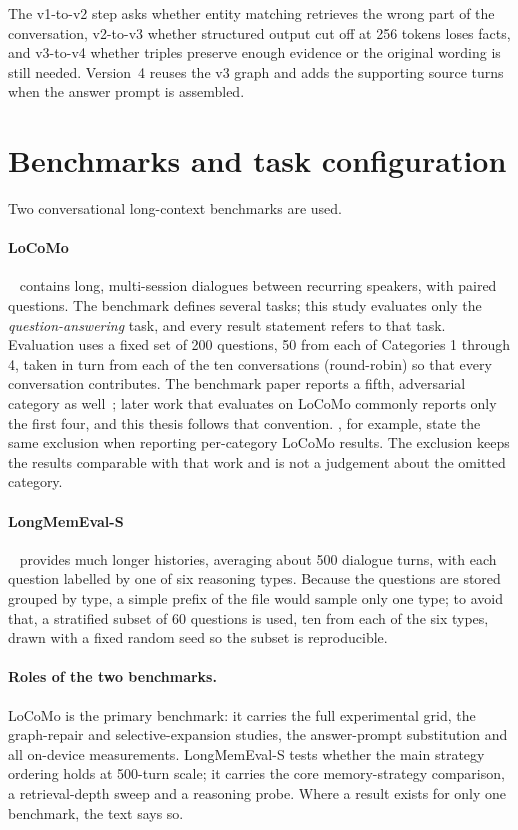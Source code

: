 The v1-to-v2 step asks whether entity matching retrieves the wrong part of the conversation, v2-to-v3
whether structured output cut off at 256 tokens loses facts, and v3-to-v4 whether triples preserve
enough evidence or the original wording is still needed. Version~4 reuses the v3 graph and adds the
supporting source turns when the answer prompt is assembled.

\section{Benchmarks and task configuration}
\label{sec:benchmarks}

Two conversational long-context benchmarks are used.

\paragraph{LoCoMo}~\citep{locomo} contains long, multi-session dialogues between recurring speakers,
with paired questions. The benchmark defines several tasks; this study evaluates only the
\emph{question-answering} task, and every result statement refers to that task. Evaluation uses a
fixed set of 200 questions, 50 from each of Categories 1 through 4, taken in turn from each of the
ten conversations (round-robin) so that every conversation contributes. The benchmark paper reports
a fifth, adversarial category as well~\citep{locomo}; later work that evaluates on LoCoMo commonly
reports only the first four, and this thesis follows that convention. \citet{budgetmem}, for example,
state the same exclusion when reporting per-category LoCoMo results. The exclusion keeps the
results comparable with that work and is not a judgement about the omitted category.

\paragraph{LongMemEval-S}~\citep{longmemeval} provides much longer histories, averaging about 500
dialogue turns, with each question labelled by one of six reasoning types. Because the questions are
stored grouped by type, a simple prefix of the file would sample only one type; to avoid that, a
stratified subset of 60 questions is used, ten from each of the six types, drawn with a fixed random
seed so the subset is reproducible.

\paragraph{Roles of the two benchmarks.} LoCoMo is the primary benchmark: it carries the full
experimental grid, the graph-repair and selective-expansion studies, the answer-prompt substitution
and all on-device measurements. LongMemEval-S tests whether the main strategy ordering holds at
500-turn scale; it carries the core memory-strategy comparison, a retrieval-depth sweep and a
reasoning probe. Where a result exists for only one benchmark, the text says so.

